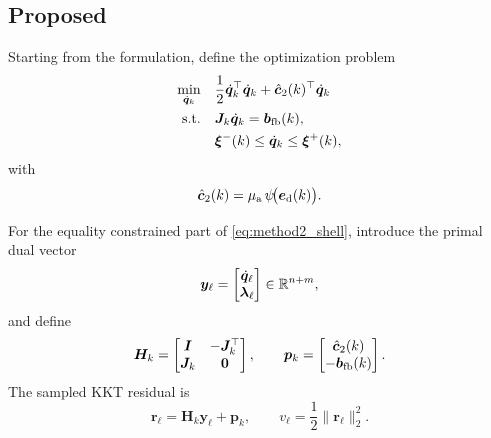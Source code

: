 \subsection{Proposed \methodtwoDL{}}

Starting from the \methodtwo{} formulation, define the optimization problem
\begin{equation}
  \begin{aligned}
    \min_{\dot{\bm{q}}_k} \quad &
      \frac{1}{2}\dot{\bm{q}}_k^\top \dot{\bm{q}}_k + \hat{\bm{c}}_2(k)^\top \dot{\bm{q}}_k \\
    \text{s.t.} \quad &
      \bm{J}_k \dot{\bm{q}}_k = \bm{b}_{\mathrm{fb}}(k), \\
    &
      \bm{\xi}^{-}(k) \le \dot{\bm{q}}_k \le \bm{\xi}^{+}(k),
  \end{aligned}
  \label{eq:method2_shell}
\end{equation}
with
\begin{equation}
  \hat{\bm{c}}_2(k) = \mu_{\mathrm{a}} \, \psi\!\bigl(\bm{e}_{\mathrm{d}}(k)\bigr).
\end{equation}

For the equality constrained part of \eqref{eq:method2_shell}, introduce the primal dual vector
\begin{equation}
  \bm{y}_\ell =
  \begin{bmatrix}
    \dot{\bm{q}}_\ell \\
    \bm{\lambda}_\ell
  \end{bmatrix}
  \in \mathbb{R}^{n+m},
\end{equation}
and define
\begin{equation}
  \bm{H}_k =
  \begin{bmatrix}
    \bm{I} & -\bm{J}_k^\top \\
    \bm{J}_k & \bm{0}
  \end{bmatrix},
  \qquad
  \bm{p}_k =
  \begin{bmatrix}
    \hat{\bm{c}}_2(k) \\
    -\bm{b}_{\mathrm{fb}}(k)
  \end{bmatrix}.
  \label{eq:method2_Hp}
\end{equation}
The sampled KKT residual is
\begin{equation}
  \bm{r}_\ell = \bm{H}_k \bm{y}_\ell + \bm{p}_k,
  \qquad
  v_\ell = \frac{1}{2}\|\bm{r}_\ell\|_2^2.
  \label{eq:method2_residual}
\end{equation}

